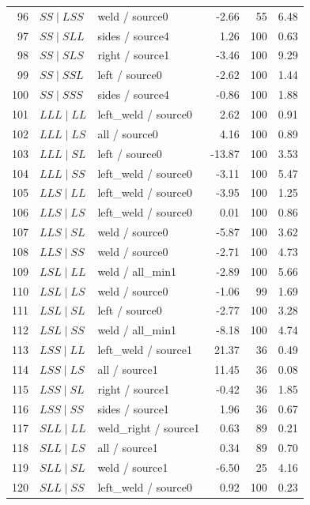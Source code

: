 \begin{longtable}{@{}r>{\raggedright\arraybackslash}p{.28\linewidth}>{\raggedright\arraybackslash}p{.27\linewidth}rrr@{}}
96 & $SS\mid LSS$ & weld / source0 & -2.66 & 55 & 6.48\\
97 & $SS\mid SLL$ & sides / source4 & 1.26 & 100 & 0.63\\
98 & $SS\mid SLS$ & right / source1 & -3.46 & 100 & 9.29\\
99 & $SS\mid SSL$ & left / source0 & -2.62 & 100 & 1.44\\
100 & $SS\mid SSS$ & sides / source4 & -0.86 & 100 & 1.88\\
101 & $LLL\mid LL$ & left\_\allowbreak weld / source0 & 2.62 & 100 & 0.91\\
102 & $LLL\mid LS$ & all / source0 & 4.16 & 100 & 0.89\\
103 & $LLL\mid SL$ & left / source0 & -13.87 & 100 & 3.53\\
104 & $LLL\mid SS$ & left\_\allowbreak weld / source0 & -3.11 & 100 & 5.47\\
105 & $LLS\mid LL$ & left\_\allowbreak weld / source0 & -3.95 & 100 & 1.25\\
106 & $LLS\mid LS$ & left\_\allowbreak weld / source0 & 0.01 & 100 & 0.86\\
107 & $LLS\mid SL$ & weld / source0 & -5.87 & 100 & 3.62\\
108 & $LLS\mid SS$ & weld / source0 & -2.71 & 100 & 4.73\\
109 & $LSL\mid LL$ & weld / all\_\allowbreak min1 & -2.89 & 100 & 5.66\\
110 & $LSL\mid LS$ & weld / source0 & -1.06 & 99 & 1.69\\
111 & $LSL\mid SL$ & left / source0 & -2.77 & 100 & 3.28\\
112 & $LSL\mid SS$ & weld / all\_\allowbreak min1 & -8.18 & 100 & 4.74\\
113 & $LSS\mid LL$ & left\_\allowbreak weld / source1 & 21.37 & 36 & 0.49\\
114 & $LSS\mid LS$ & all / source1 & 11.45 & 36 & 0.08\\
115 & $LSS\mid SL$ & right / source1 & -0.42 & 36 & 1.85\\
116 & $LSS\mid SS$ & sides / source1 & 1.96 & 36 & 0.67\\
117 & $SLL\mid LL$ & weld\_\allowbreak right / source1 & 0.63 & 89 & 0.21\\
118 & $SLL\mid LS$ & all / source1 & 0.34 & 89 & 0.70\\
119 & $SLL\mid SL$ & weld / source1 & -6.50 & 25 & 4.16\\
120 & $SLL\mid SS$ & left\_\allowbreak weld / source0 & 0.92 & 100 & 0.23\\

\end{longtable}
